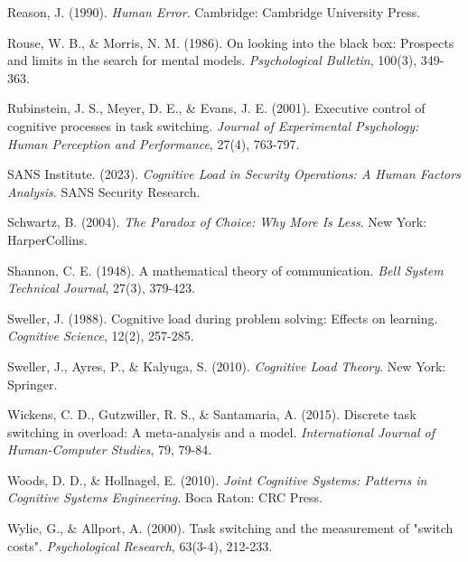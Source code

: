 \documentclass[11pt,a4paper]{article}
\begin{document}
\begin{thebibliography}{99}
Reason, J. (1990). \textit{Human Error}. Cambridge: Cambridge University Press.

Rouse, W. B., \& Morris, N. M. (1986). On looking into the black box: Prospects and limits in the search for mental models. \textit{Psychological Bulletin}, 100(3), 349-363.

Rubinstein, J. S., Meyer, D. E., \& Evans, J. E. (2001). Executive control of cognitive processes in task switching. \textit{Journal of Experimental Psychology: Human Perception and Performance}, 27(4), 763-797.

SANS Institute. (2023). \textit{Cognitive Load in Security Operations: A Human Factors Analysis}. SANS Security Research.

Schwartz, B. (2004). \textit{The Paradox of Choice: Why More Is Less}. New York: HarperCollins.

Shannon, C. E. (1948). A mathematical theory of communication. \textit{Bell System Technical Journal}, 27(3), 379-423.

Sweller, J. (1988). Cognitive load during problem solving: Effects on learning. \textit{Cognitive Science}, 12(2), 257-285.

Sweller, J., Ayres, P., \& Kalyuga, S. (2010). \textit{Cognitive Load Theory}. New York: Springer.

Wickens, C. D., Gutzwiller, R. S., \& Santamaria, A. (2015). Discrete task switching in overload: A meta-analysis and a model. \textit{International Journal of Human-Computer Studies}, 79, 79-84.

Woods, D. D., \& Hollnagel, E. (2010). \textit{Joint Cognitive Systems: Patterns in Cognitive Systems Engineering}. Boca Raton: CRC Press.

Wylie, G., \& Allport, A. (2000). Task switching and the measurement of "switch costs". \textit{Psychological Research}, 63(3-4), 212-233.

\end{thebibliography}
\end{document}
